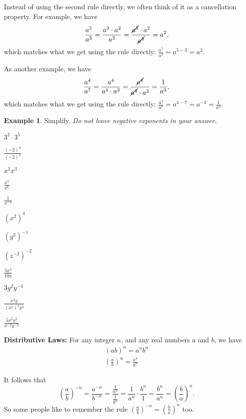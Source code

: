 \documentclass[letterpaper,12pt,oneside]{book}
\theoremstyle{definition}
\newtheorem{example}[theorem]{Example}
\begin{document}
Instead of using the second rule directly, we often think of it as a cancellation property.  For example, we have
\[
\frac{a^5}{a^3}=\frac{a^3\cdot a^2}{a^3}=\frac{\cancel{a^3}\cdot a^2}{\cancel{a^3}}=a^2,
\]
which matches what we get using the rule directly: $\frac{a^5}{a^3}=a^{5-3}=a^2$.

As another example, we have
\[
\frac{a^4}{a^7}=\frac{a^4}{a^4\cdot a^3}=\frac{\cancel{a^4}}{\cancel{a^4}\cdot a^3}=\frac{1}{a^3},
\]
which matches what we get using the rule directly: $\frac{a^4}{a^7}=a^{4-7}=a^{-3}=\frac{1}{a^3}$.

\begin{example} Simplify.  \emph{Do not leave negative exponents in your answer.}
\begin{enumerate}
\begin{multicols*}{2}
\item $3^2\cdot 3^5$
\vfill\null
\item $\displaystyle\frac{(-2)^9}{(-2)^7}$
\vfill\null
\item $x^2x^3$
\vfill\null
\item $\displaystyle\frac{x^4}{x^6}$
\vfill\null
\item $\displaystyle\frac{1}{x^{-2}}$
\vfill\null
\item $(x^2)^4$
\vfill\null
\columnbreak
\item $(y^3)^{-1}$
\vfill\null
\item $(z^{-2})^{-2}$
\vfill\null
\item $\displaystyle\frac{5x^3}{10x}$
\vfill\null
\item $3y^2y^{-4}$
\vfill\null
\item $\displaystyle\frac{x^3y}{(x^2)^4y^3}$
\vfill\null
\item $\displaystyle\frac{5x^3y^2}{x^{-2}y^{-2}}$
\vfill\null
\end{multicols*}
\end{enumerate}
\end{example}

\newpage

\noindent
\textbf{Distributive Laws:} For any integer $n$, and any real numbers $a$ and $b$, we have
\begin{align*}
(ab)^n=a^nb^n\\
\left(\frac{a}{b}\right)^n=\frac{a^n}{b^n}
\end{align*}

It follows that 
\[
\left(\frac{a}{b}\right)^{-n}=\frac{a^{-n}}{b^{-n}}=\frac{\tfrac{1}{a^n}}{\tfrac{1}{b^n}}=\frac{1}{a^n}\cdot \frac{b^n}{1}=\frac{b^n}{a^n}=\left(\frac{b}{a}\right)^n.
\]
So some people like to remember the rule $\displaystyle\left(\frac{a}{b}\right)^{-n}=\left(\frac{b}{a}\right)^n$ too.
\end{document}
